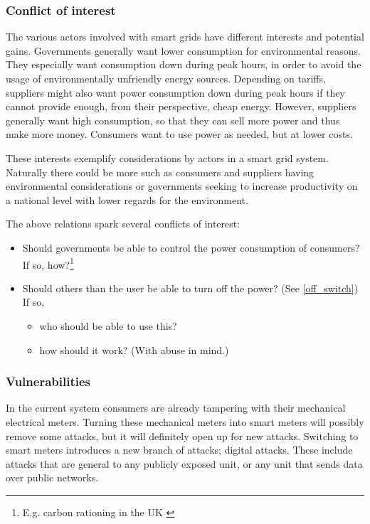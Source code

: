\subsubsection{Conflict of interest}
The various actors involved with smart grids have different interests and potential gains.
Governments generally want lower consumption for environmental reasons.
They especially want consumption down during peak hours, in order to avoid the usage of environmentally unfriendly energy sources.
Depending on tariffs, suppliers might also want power consumption down during peak hours if they cannot provide enough, from their perspective, cheap energy.
However, suppliers generally want high consumption, so that they can sell more power and thus make more money.
Consumers want to use power as needed, but at lower costs.

These interests exemplify considerations by actors in a smart grid system.
Naturally there could be more such as consumers and suppliers having environmental considerations or governments seeking to increase productivity on a national level with lower regards for the environment.

The above relations spark several conflicts of interest:
\begin{itemize}
	\item Should governments be able to control the power consumption of consumers? If so, how?\footnote{E.g. carbon rationing in the UK \cite{security_economics}}
	\item Should others than the user be able to turn off the power? (See \cref{off_switch}) If so,
	\begin{itemize}
		\item who should be able to use this?
		\item how should it work? (With abuse in mind.)
	\end{itemize}	
\end{itemize}

\subsubsection{Vulnerabilities}
In the current system consumers are already tampering  with their mechanical electrical meters.
Turning these mechanical meters into smart meters will possibly remove some attacks, but it will definitely open up for new attacks.
Switching to smart meters introduces a new branch of attacks; digital attacks.
These include attacks that are general to any publicly exposed unit, or any unit that sends data over public networks.
